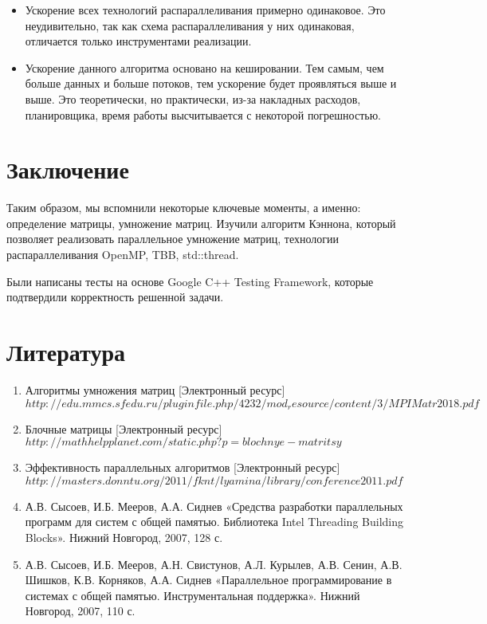 \documentclass{report}
\begin{document}
\begin{itemize}
\item Ускорение всех технологий распараллеливания примерно одинаковое. Это неудивительно, так как схема распараллеливания у них одинаковая, отличается только инструментами реализации.
\item  Ускорение данного алгоритма основано на кешировании. Тем самым, чем больше данных и больше потоков, тем ускорение будет проявляться выше и выше. Это теоретически, но практически, из-за накладных расходов, планировщика, время работы высчитывается с некоторой погрешностью.
\end{itemize}
\newpage

\section*{Заключение}
Таким образом, мы вспомнили некоторые ключевые моменты, а именно: определение матрицы, умножение матриц. Изучили алгоритм Кэннона, который позволяет реализовать параллельное умножение матриц, технологии распараллеливания OpenMP, TBB, std::thread.

Были написаны тесты на основе Google C++ Testing Framework, которые подтвердили корректность решенной задачи.
\newpage

\section*{Литература}
\begin{enumerate}
\item Алгоритмы умножения матриц [Электронный ресурс]\\$http://edu.mmcs.sfedu.ru/pluginfile.php/4232/mod_resource/content/3/MPIMatr2018.pdf$\\
\item Блочные матрицы [Электронный ресурс]\\$http://mathhelpplanet.com/static.php?p=blochnye-matritsy$\\
\item Эффективность параллельных алгоритмов [Электронный ресурс] \\$http://masters.donntu.org/2011/fknt/lyamina/library/conference2011.pdf$
\item А.В. Сысоев, И.Б. Мееров, А.А. Сиднев «Средства разработки параллельных программ для систем с общей памятью. Библиотека Intel Threading Building Blocks». Нижний Новгород, 2007, 128 с. 
\item А.В. Сысоев, И.Б. Мееров, А.Н. Свистунов, А.Л. Курылев, А.В. Сенин, А.В. Шишков, К.В. Корняков, А.А. Сиднев «Параллельное программирование в системах с общей
памятью. Инструментальная поддержка». Нижний Новгород, 2007, 110 с. 
\end{enumerate} 
\newpage
\end{document}
